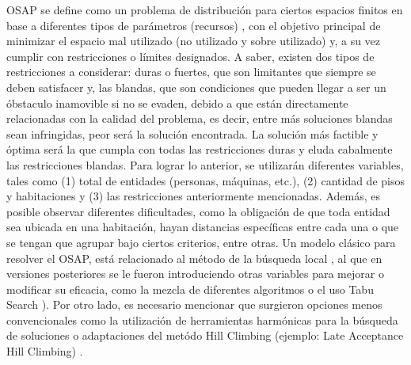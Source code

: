 \documentclass[letter, 10pt]{article}
\begin{document}
OSAP se define como un problema de distribuci\'on para ciertos espacios finitos en base a diferentes tipos de par\'ametros (recursos) \cite{awadallah2012office}, con el objetivo principal de minimizar el espacio mal utilizado (no utilizado y sobre utilizado) y, a su vez cumplir con restricciones o l\'imites designados. A saber, existen dos tipos de restricciones a considerar: duras o fuertes, que son limitantes que siempre se deben satisfacer y, las blandas, que son condiciones que pueden llegar a ser un \'obstaculo inamovible si no se evaden, debido a que est\'an directamente relacionadas con la calidad del problema, es decir, entre m\'as soluciones blandas sean infringidas, peor ser\'a la soluci\'on encontrada. La soluci\'on m\'as factible y \'optima ser\'a la que cumpla con todas las restricciones duras y eluda cabalmente las restricciones blandas.
Para lograr lo anterior, se utilizar\'an diferentes variables, tales como (1) total de entidades (personas, m\'aquinas, etc.), (2) cantidad de pisos y habitaciones y (3) las restricciones anteriormente mencionadas. Adem\'as, es posible observar diferentes dificultades, como la obligaci\'on de que toda entidad sea ubicada en una habitaci\'on, hayan distancias espec\'ificas entre cada una o que se tengan que agrupar bajo ciertos criterios, entre otras.
Un modelo cl\'asico para resolver el OSAP, est\'a relacionado al m\'etodo de la b\'usqueda local \cite{lopes2010office}, al que en versiones posteriores se le fueron introduciendo otras variables para mejorar o modificar su eficacia, como la mezcla de diferentes algoritmos o el uso Tabu Search \cite{USM}). Por otro lado, es necesario mencionar que surgieron opciones menos convencionales como la utilizaci\'on de herramientas harm\'onicas para la b\'usqueda de soluciones \cite{awadallah2012office} o adaptaciones del met\'odo Hill Climbing (ejemplo: Late Acceptance Hill Climbing) \cite{bolaji2019adaptation}.

\end{document}
